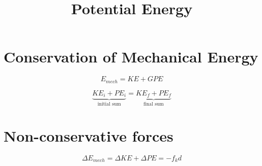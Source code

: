 \documentclass[12pt]{article}
\title{\textbf{Potential Energy}}
\date{}
\begin{document}
\maketitle

\begin{spacing}{1.5}

\section{Conservation of Mechanical Energy}

$$E_{mech} = KE + GPE$$

$$\underbrace{KE_i + PE_i}_{\text{initial sum}} = \underbrace{KE_f + PE_f}_{\text{final sum}}$$

\section{Non-conservative forces}

$$\Delta E_{mech} = \Delta KE + \Delta PE = -f_k d$$

\end{spacing}
\end{document}
